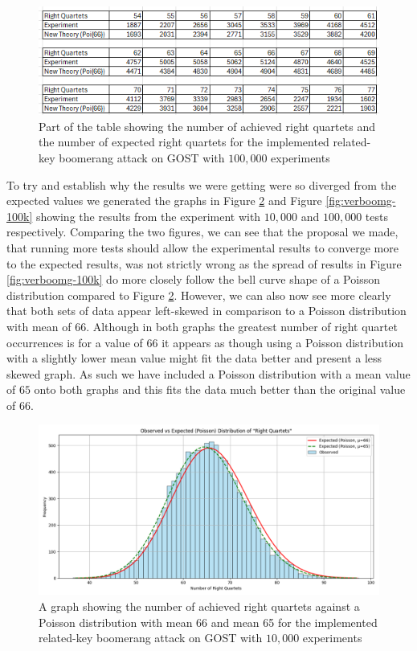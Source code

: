 \documentclass[10pt,journal,compsoc]{IEEEtran}
\begin{document}
\begin{figure}[hbt!]
    \centering
    \includegraphics[width=\linewidth]{Figures/verBoomTableMid-100k.png}
    \caption{Part of the table showing the number of achieved right quartets and the number of expected right quartets for the implemented related-key boomerang attack on GOST with \(100,000\) experiments}
    \label{fig:verboom-100k}
\end{figure}

To try and establish why the results we were getting were so diverged from the expected values we generated the graphs in Figure \ref{fig:verboomg-10k} and Figure \ref{fig:verboomg-100k} showing the results from the experiment with \(10,000\) and \(100,000\) tests respectively. Comparing the two figures, we can see that the proposal we made, that running more tests should allow the experimental results to converge more to the expected results, was not strictly wrong as the spread of results in Figure \ref{fig:verboomg-100k} do more closely follow the bell curve shape of a Poisson distribution compared to Figure \ref{fig:verboomg-10k}. However, we can also now see more clearly that both sets of data appear left-skewed  in comparison to a Poisson distribution with mean of \(66\). Although in both graphs the greatest number of right quartet occurrences is for a value of \(66\) it appears as though using a Poisson distribution with a slightly lower mean value might fit the data better and present a less skewed graph. As such we have included a Poisson distribution with a mean value of \(65\) onto both graphs and this fits the data much better than the original value of \(66\).

\begin{figure}[hbt!]
    \centering
    \includegraphics[width=\linewidth]{Figures/verBoomGraph.png}
    \caption{A graph showing the number of achieved right quartets against a Poisson distribution with mean 66 and mean 65 for the implemented related-key boomerang attack on GOST with \(10,000\) experiments}
    \label{fig:verboomg-10k}
\end{figure}
\end{document}
